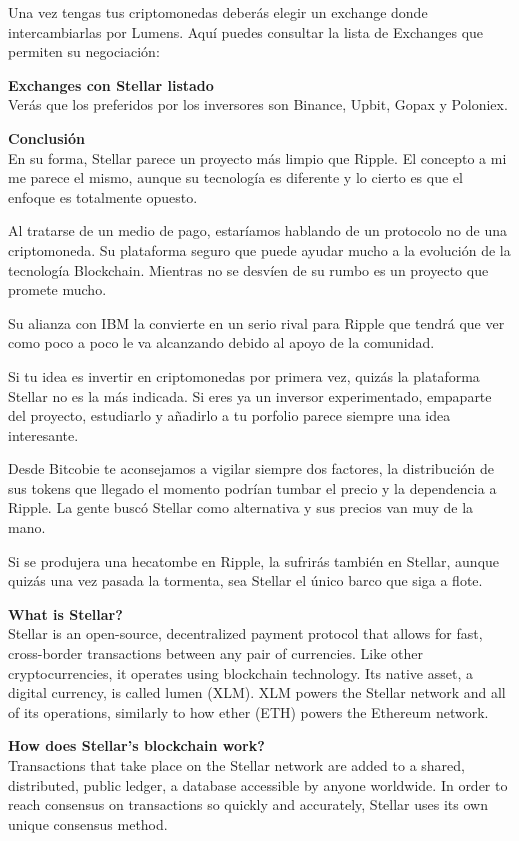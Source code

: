 \documentclass[a4paper,12pt]{/home/armando/Documentos/Cursos/LaTeX/Plantillas/lib/pub}
\begin{document}
	Una vez tengas tus criptomonedas deberás elegir un exchange donde intercambiarlas por Lumens. Aquí puedes consultar la lista de Exchanges que permiten su negociación:
	
	\textbf{Exchanges con Stellar listado}\\
	
	Verás que los preferidos por los inversores son Binance, Upbit, Gopax y Poloniex.
	
	\textbf{Conclusión}\\
	En su forma, Stellar parece un proyecto más limpio que Ripple. El concepto a mi me parece el mismo, aunque su tecnología es diferente y lo cierto es que el enfoque es totalmente opuesto.
	
	Al tratarse de un medio de pago, estaríamos hablando de un protocolo no de una criptomoneda. Su plataforma seguro que puede ayudar mucho a la evolución de la tecnología Blockchain. Mientras no se desvíen de su rumbo es un proyecto que promete mucho.
	
	Su alianza con IBM la convierte en un serio rival para Ripple que tendrá que ver como poco a poco le va alcanzando debido al apoyo de la comunidad.
	
	Si tu idea es invertir en criptomonedas por primera vez, quizás la plataforma Stellar no es la más indicada. Si eres ya un inversor experimentado, empaparte del proyecto, estudiarlo y añadirlo a tu porfolio parece siempre una idea interesante.
	
	Desde Bitcobie te aconsejamos a vigilar siempre dos factores, la distribución de sus tokens que llegado el momento podrían tumbar el precio y la dependencia a Ripple. La gente buscó Stellar como alternativa y sus precios van muy de la mano.
	
	Si se produjera una hecatombe en Ripple, la sufrirás también en Stellar, aunque quizás una vez pasada la tormenta, sea Stellar el único barco que siga a flote.
	
	\textbf{What is Stellar?}\\
	Stellar is an open-source, decentralized payment protocol that allows for fast, cross-border transactions between any pair of currencies. Like other cryptocurrencies, it operates using blockchain technology. Its native asset, a digital currency, is called lumen (XLM). XLM powers the Stellar network and all of its operations, similarly to how ether (ETH) powers the Ethereum network.
	
	\textbf{How does Stellar’s blockchain work?}\\
	Transactions that take place on the Stellar network are added to a shared, distributed, public ledger, a database accessible by anyone worldwide. In order to reach consensus on transactions so quickly and accurately, Stellar uses its own unique consensus method.
	
\end{document}
